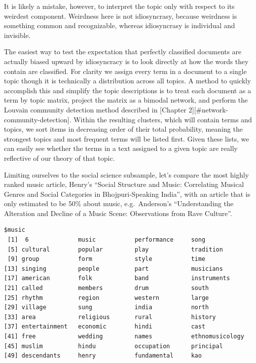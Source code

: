 \documentclass[]{book}
\theoremstyle{definition}
\theoremstyle{definition}
\theoremstyle{definition}
\theoremstyle{remark}
\begin{document}
It is likely a mistake, however, to interpret the topic only with
respect to its weirdest component. Weirdness here is not idiosyncrasy,
because weirdness is something common and recognizable, whereas
idiosyncrasy is individual and invisible.

The easiest way to test the expectation that perfectly classified
documents are actually biased upward by idiosyncracy is to look directly
at how the words they contain are classified. For clarity we assign
every term in a document to a single topic though it is technically a
distribution across all topics. A method to quickly accomplish this and
simplify the topic descriptions is to treat each document as a term by
topic matrix, project the matrix as a bimodal network, and perform the
Louvain community detection method described in {[}Chapter
2{]}{[}\#network-community-detection{]}. Within the resulting clusters,
which will contain terms and topics, we sort items in decreasing order
of their total probability, meaning the strongest topics and most
frequent terms will be listed first. Given these lists, we can easily
see whether the terms in a text assigned to a given topic are really
reflective of our theory of that topic.

Limiting ourselves to the social science subsample, let's compare the
most highly ranked music article, Henry's ``Social Structure and Music:
Correlating Musical Genres and Social Categories in Bhojpuri-Speaking
India'', with an article that is only estimated to be 50\% about music,
e.g.~Anderson's ``Understanding the Alteration and Decline of a Music
Scene: Observations from Rave Culture''.

\begin{verbatim}
$music
 [1]  6              music           performance     song           
 [5] cultural        popular         play            tradition      
 [9] group           form            style           time           
[13] singing         people          part            musicians      
[17] american        folk            band            instruments    
[21] called          members         drum            south          
[25] rhythm          region          western         large          
[29] village         sung            india           north          
[33] area            religious       rural           history        
[37] entertainment   economic        hindi           cast           
[41] free            wedding         names           ethnomusicology
[45] muslim          hindu           occupation      principal      
[49] descendants     henry           fundamental     kao            
\end{verbatim}
\end{document}
